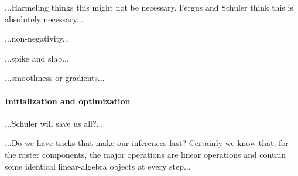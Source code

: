 \documentclass[12pt]{article}
\begin{document}
...Harmeling thinks this might not be necessary.  Fergus and Schuler
think this is absolutely necessary...

...non-negativity...

...spike and slab...

...smoothness or gradients...

\paragraph{Initialization and optimization}

...Schuler will save us all?...

...Do we have tricks that make our inferences fast?  Certainly we know
that, for the raster components, the major operations are linear
operations and contain some identical linear-algebra objects at every
step...
\end{document}
